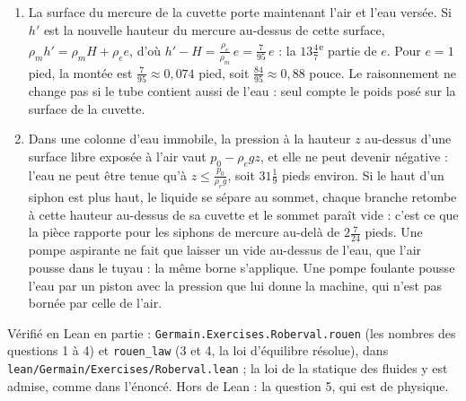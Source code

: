 \documentclass[11pt,a4paper]{article}
\begin{document}
\begin{solution}
\begin{enumerate}
\[  = \frac{4973}{2280} \approx 2{,}181
  \]
  pieds. Le haut de l'eau est à $h + \frac32 \approx 3{,}681$ pieds, et le vide mesure
  $4 - \frac{8393}{2280} = \frac{727}{2280} \approx 0{,}319$ pied, soit un peu moins
  de quatre pouces. On vérifie que $\frac32 = \frac{95}{7}\cdot\frac{21}{190}$.
\item La surface du mercure de la cuvette porte maintenant l'air et l'eau versée.
  Si $h'$ est la nouvelle hauteur du mercure au-dessus de cette surface,
  $\rho_m h' = \rho_m H + \rho_e e$, d'où $h' - H = \frac{\rho_e}{\rho_m}\,e =
  \frac{7}{95}\,e$ : la $13\frac47$\textsuperscript{e} partie de $e$. Pour
  $e = 1$ pied, la montée est $\frac{7}{95} \approx 0{,}074$ pied, soit
  $\frac{84}{95} \approx 0{,}88$ pouce. Le raisonnement ne change pas si le tube
  contient aussi de l'eau : seul compte le poids posé sur la surface de la cuvette.
\item Dans une colonne d'eau immobile, la pression à la hauteur $z$ au-dessus
  d'une surface libre exposée à l'air vaut $p_0 - \rho_e g z$, et elle ne peut
  devenir négative : l'eau ne peut être tenue qu'à $z \le \frac{p_0}{\rho_e g}$,
  soit $31\frac19$ pieds environ. Si le haut d'un siphon est plus haut, le liquide
  se sépare au sommet, chaque branche retombe à cette hauteur au-dessus de sa
  cuvette et le sommet paraît vide : c'est ce que la pièce rapporte pour les
  siphons de mercure au-delà de $2\frac{7}{24}$ pieds. Une pompe aspirante ne fait
  que laisser un vide au-dessus de l'eau, que l'air pousse dans le tuyau : la même
  borne s'applique. Une pompe foulante pousse l'eau par un piston avec la pression
  que lui donne la machine, qui n'est pas bornée par celle de l'air.
\end{enumerate}

Vérifié en Lean en partie : \texttt{Germain.Exercises.Roberval.rouen} (les nombres des
questions 1 à 4) et \texttt{rouen\_law} (3 et 4, la loi d'équilibre résolue), dans
\texttt{lean/Germain/Exercises/Roberval.lean} ; la loi de la statique des fluides y est admise, comme dans l'énoncé.
Hors de Lean : la question 5, qui est de physique.
\end{solution}
\end{document}
